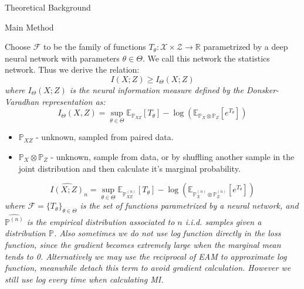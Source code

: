 \documentclass[final]{beamer}
\newlength{\colwidth}
\begin{document}
\begin{frame}[t]
\begin{columns}[t]
\begin{column}{\colwidth}
\begin{block}{Theoretical Background}
\end{block}

\begin{alertblock}{Main Method}

      Choose $\mathcal F$ to be the family of functions $T_{\theta} : \mathcal X \times \mathcal Z \to \mathbb R$ parametrized by a deep neural network with parameters $θ ∈ Θ$. We call this network the statistics network. Thus we derive the relation:
        \begin{equation}
            I(X;Z) \geq I_{\Theta}(X;Z)
        \end{equation}
        \textit{where $I_{\Theta}(X;Z)$ is the neural information measure defined by the Donsker-Varadhan representation as:}
        \begin{equation}
            I_\Theta(X, Z) = \sup_{\theta \in \Theta} \mathbb{E}_{\mathbb{P}_{XZ}}[T_\theta] - \log(\mathbb{E}_{\mathbb{P}_X \otimes \mathbb{P}_Z}[e^{T_\theta}])
        \end{equation}
        \begin{itemize}
            \item $\mathbb P_{XZ}$ - unknown, sampled from paired data.
            \item $\mathbb P_X \otimes \mathbb P_Z$ - unknown, sample from data, or by shuffling another sample in the joint distribution and then calculate it’s marginal probability.
        \end{itemize}
        \begin{equation}
            \widehat{I(X;Z)}_n = \sup_{\theta \in \Theta} \mathbb{E}_{\mathbb{P}^{(n)}_{XZ}}[T_\theta] - \log(\mathbb{E}_{\mathbb{P}^{(n)}_X \otimes \mathbb{P}^{(n)}_Z}[e^{T_\theta}])
        \end{equation}
        \textit{where $\mathcal F = \{T_θ\}_{θ∈Θ}$ is the set of functions parametrized by a neural network, and $\hat{\mathbb P^{(n)}}$ is the empirical distribution associated to $n$ i.i.d. samples given a distribution $\mathbb P$. Also sometimes we do not use log function directly in the loss function, since the gradient becomes extremely large when the marginal mean tends to 0. Alternatively we may use the reciprocal of EAM to approximate log function, meanwhile detach this term to avoid gradient calculation. However we still use log every time when calculating MI.}


\end{alertblock}
\end{column}
\end{columns}
\end{frame}
\end{document}
